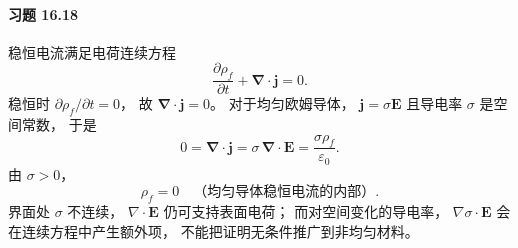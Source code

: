 \paragraph{习题 16.18}
稳恒电流满足电荷连续方程
\[
 \frac{\partial\rho_f}{\partial t}
 +\boldsymbol\nabla\cdot\boldsymbol j=0.
\]
稳恒时
\(\partial\rho_f/\partial t=0\)，
故
\(\boldsymbol\nabla\cdot\boldsymbol j=0\)。
对于均匀欧姆导体，
\(\boldsymbol j=\sigma\boldsymbol E\)
且导电率 \(\sigma\) 是空间常数，
于是
\[
 0=\boldsymbol\nabla\cdot\boldsymbol j
 =\sigma\,\boldsymbol\nabla\cdot\boldsymbol E
 =\frac{\sigma\rho_f}{\varepsilon_0}.
\]
由 \(\sigma>0\)，
\[
 \boxed{\rho_f=0
 \quad\text{（均匀导体稳恒电流的内部）}}.
\]
界面处 \(\sigma\) 不连续，
\(\nabla\cdot\boldsymbol E\) 仍可支持表面电荷；
而对空间变化的导电率，
\(\nabla\sigma\cdot\boldsymbol E\)
会在连续方程中产生额外项，
不能把证明无条件推广到非均匀材料。
